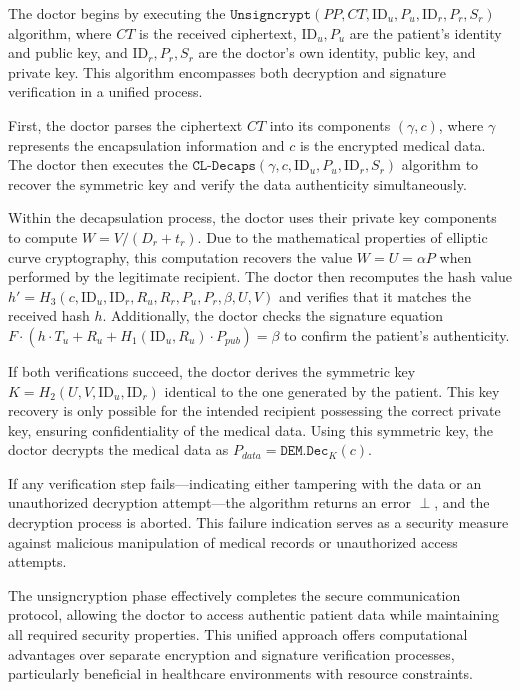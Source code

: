\documentclass[10pt]{article}
\begin{document}
The doctor begins by executing the $\texttt{Unsigncrypt}(PP, CT, \text{ID}_u, P_u, \text{ID}_r, P_r, S_r)$ algorithm, where $CT$ is the received ciphertext, $\text{ID}_u, P_u$ are the patient's identity and public key, and $\text{ID}_r, P_r, S_r$ are the doctor's own identity, public key, and private key. This algorithm encompasses both decryption and signature verification in a unified process.

First, the doctor parses the ciphertext $CT$ into its components $(\gamma, c)$, where $\gamma$ represents the encapsulation information and $c$ is the encrypted medical data. The doctor then executes the $\texttt{CL-Decaps}(\gamma, c, \text{ID}_u, P_u, \text{ID}_r, S_r)$ algorithm to recover the symmetric key and verify the data authenticity simultaneously.

Within the decapsulation process, the doctor uses their private key components to compute $W = V/(D_r + t_r)$. Due to the mathematical properties of elliptic curve cryptography, this computation recovers the value $W = U = \alpha P$ when performed by the legitimate recipient. The doctor then recomputes the hash value $h' = H_3(c, \text{ID}_u, \text{ID}_r, R_u, R_r, P_u, P_r, \beta, U, V)$ and verifies that it matches the received hash $h$. Additionally, the doctor checks the signature equation $F \cdot (h \cdot T_u + R_u + H_1(\text{ID}_u, R_u) \cdot P_{pub}) = \beta$ to confirm the patient's authenticity.

If both verifications succeed, the doctor derives the symmetric key $K = H_2(U, V, \text{ID}_u, \text{ID}_r)$ identical to the one generated by the patient. This key recovery is only possible for the intended recipient possessing the correct private key, ensuring confidentiality of the medical data. Using this symmetric key, the doctor decrypts the medical data as $P_{data} = \texttt{DEM.Dec}_K(c)$.

If any verification step fails—indicating either tampering with the data or an unauthorized decryption attempt—the algorithm returns an error $\perp$, and the decryption process is aborted. This failure indication serves as a security measure against malicious manipulation of medical records or unauthorized access attempts.

The unsigncryption phase effectively completes the secure communication protocol, allowing the doctor to access authentic patient data while maintaining all required security properties. This unified approach offers computational advantages over separate encryption and signature verification processes, particularly beneficial in healthcare environments with resource constraints.
\end{document}
